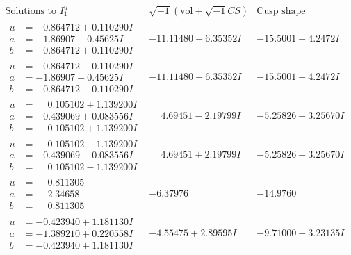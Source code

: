 \documentclass[1p]{elsarticle_modified}
\theoremstyle{definition}
\newcommand{\I}{\sqrt{-1}}
\begin{document}
$$\begin{array}{c|c|c}  
\text{Solutions to }I^u_{1}& \I (\text{vol} + \sqrt{-1}CS) & \text{Cusp shape}\\
 \hline 
\begin{aligned}
u &= -0.864712 + 0.110290 I \\
a &= -1.86907 - 0.45625 I \\
b &= -0.864712 + 0.110290 I\end{aligned}
 & -11.11480 + 6.35352 I & -15.5001 - 4.2472 I \\ \hline\begin{aligned}
u &= -0.864712 - 0.110290 I \\
a &= -1.86907 + 0.45625 I \\
b &= -0.864712 - 0.110290 I\end{aligned}
 & -11.11480 - 6.35352 I & -15.5001 + 4.2472 I \\ \hline\begin{aligned}
u &= \phantom{-}0.105102 + 1.139200 I \\
a &= -0.439069 + 0.083556 I \\
b &= \phantom{-}0.105102 + 1.139200 I\end{aligned}
 & \phantom{-}4.69451 - 2.19799 I & -5.25826 + 3.25670 I \\ \hline\begin{aligned}
u &= \phantom{-}0.105102 - 1.139200 I \\
a &= -0.439069 - 0.083556 I \\
b &= \phantom{-}0.105102 - 1.139200 I\end{aligned}
 & \phantom{-}4.69451 + 2.19799 I & -5.25826 - 3.25670 I \\ \hline\begin{aligned}
u &= \phantom{-}0.811305\phantom{ +0.000000I} \\
a &= \phantom{-}2.34658\phantom{ +0.000000I} \\
b &= \phantom{-}0.811305\phantom{ +0.000000I}\end{aligned}
 & -6.37976\phantom{ +0.000000I} & -14.9760\phantom{ +0.000000I} \\ \hline\begin{aligned}
u &= -0.423940 + 1.181130 I \\
a &= -1.389210 + 0.220558 I \\
b &= -0.423940 + 1.181130 I\end{aligned}
 & -4.55475 + 2.89595 I & -9.71000 - 3.23135 I \\ \hline\begin{aligned}

\end{aligned}
\end{array}$$
\end{document}
